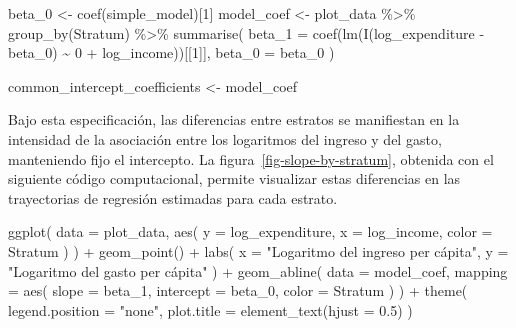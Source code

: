 \documentclass[
  spanish,
  11pt,
  letterpaper,
  oneside,
  open=any]{scrbook}
\newenvironment{Shaded}{\begin{snugshade}}{\end{snugshade}}
\newcommand{\AttributeTok}[1]{\textcolor[rgb]{0.40,0.45,0.13}{#1}}
\newcommand{\DecValTok}[1]{\textcolor[rgb]{0.68,0.00,0.00}{#1}}
\newcommand{\FloatTok}[1]{\textcolor[rgb]{0.68,0.00,0.00}{#1}}
\newcommand{\FunctionTok}[1]{\textcolor[rgb]{0.28,0.35,0.67}{#1}}
\newcommand{\NormalTok}[1]{\textcolor[rgb]{0.00,0.23,0.31}{#1}}
\newcommand{\OtherTok}[1]{\textcolor[rgb]{0.00,0.23,0.31}{#1}}
\newcommand{\SpecialCharTok}[1]{\textcolor[rgb]{0.37,0.37,0.37}{#1}}
\newcommand{\StringTok}[1]{\textcolor[rgb]{0.13,0.47,0.30}{#1}}
\newcounter{none} %
\begin{document}
\begin{Shaded}
\begin{Highlighting}[]
\NormalTok{beta\_0 }\OtherTok{\textless{}{-}} \FunctionTok{coef}\NormalTok{(simple\_model)[}\DecValTok{1}\NormalTok{]}
\NormalTok{model\_coef }\OtherTok{\textless{}{-}}\NormalTok{ plot\_data }\SpecialCharTok{\%\textgreater{}\%}
  \FunctionTok{group\_by}\NormalTok{(Stratum) }\SpecialCharTok{\%\textgreater{}\%}
  \FunctionTok{summarise}\NormalTok{(}
    \AttributeTok{beta\_1 =} \FunctionTok{coef}\NormalTok{(}\FunctionTok{lm}\NormalTok{(}\FunctionTok{I}\NormalTok{(log\_expenditure }\SpecialCharTok{{-}}\NormalTok{ beta\_0) }\SpecialCharTok{\textasciitilde{}} \DecValTok{0} \SpecialCharTok{+}\NormalTok{ log\_income))[[}\DecValTok{1}\NormalTok{]],}
    \AttributeTok{beta\_0 =}\NormalTok{ beta\_0}
\NormalTok{  )}

\NormalTok{common\_intercept\_coefficients }\OtherTok{\textless{}{-}}\NormalTok{ model\_coef}
\end{Highlighting}
\end{Shaded}

Bajo esta especificación, las diferencias entre estratos se manifiestan
en la intensidad de la asociación entre los logaritmos del ingreso y del
gasto, manteniendo fijo el intercepto. La
figura~\ref{fig-slope-by-stratum}, obtenida con el siguiente código
computacional, permite visualizar estas diferencias en las trayectorias
de regresión estimadas para cada estrato.

\begin{Shaded}
\begin{Highlighting}[]
\FunctionTok{ggplot}\NormalTok{(}
  \AttributeTok{data =}\NormalTok{ plot\_data,}
  \FunctionTok{aes}\NormalTok{(}
    \AttributeTok{y =}\NormalTok{ log\_expenditure,}
    \AttributeTok{x =}\NormalTok{ log\_income,}
    \AttributeTok{color =}\NormalTok{ Stratum}
\NormalTok{  )}
\NormalTok{) }\SpecialCharTok{+}
  \FunctionTok{geom\_point}\NormalTok{() }\SpecialCharTok{+}
  \FunctionTok{labs}\NormalTok{(}
    \AttributeTok{x =} \StringTok{"Logaritmo del ingreso per cápita"}\NormalTok{,}
    \AttributeTok{y =} \StringTok{"Logaritmo del gasto per cápita"}
\NormalTok{  ) }\SpecialCharTok{+}
  \FunctionTok{geom\_abline}\NormalTok{(}
    \AttributeTok{data =}\NormalTok{ model\_coef,}
    \AttributeTok{mapping =} \FunctionTok{aes}\NormalTok{(}
      \AttributeTok{slope =}\NormalTok{ beta\_1,}
      \AttributeTok{intercept =}\NormalTok{ beta\_0,}
      \AttributeTok{color =}\NormalTok{ Stratum}
\NormalTok{    )}
\NormalTok{  ) }\SpecialCharTok{+}
  \FunctionTok{theme}\NormalTok{(}
    \AttributeTok{legend.position =} \StringTok{"none"}\NormalTok{,}
    \AttributeTok{plot.title =} \FunctionTok{element\_text}\NormalTok{(}\AttributeTok{hjust =} \FloatTok{0.5}\NormalTok{)}
\NormalTok{  )}
\end{Highlighting}
\end{Shaded}
\end{document}
